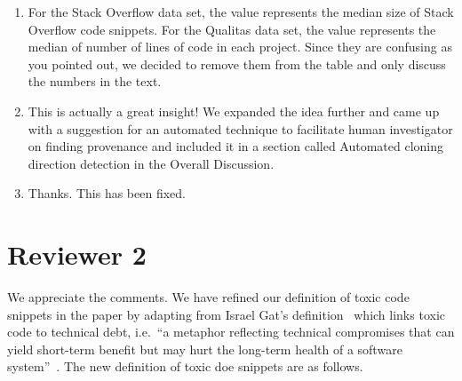 \documentclass[a4paper,twoside,10pt]{reviewresponse}
\begin{document}
\begin{enumerate}
	\item For the Stack Overflow data set, the value represents the median size of Stack Overflow code snippets. For the Qualitas data set, the value represents the median of number of lines of code in each project. Since they are confusing as you pointed out, we decided to remove them from the table and only discuss the numbers in the text.
	\item This is actually a great insight! We expanded the idea further and came up with a suggestion for an automated technique to facilitate human investigator on finding provenance and included it in a section called Automated cloning direction detection in the Overall Discussion.
	\item Thanks. This has been fixed.
\end{enumerate}

\section{Reviewer 2}


We appreciate the comments. We have refined our definition of toxic code snippets in the paper by adapting from Israel Gat's definition~\citep{toxiccode} which links toxic code to technical debt, i.e.~``a metaphor reflecting technical compromises that can yield short-term benefit but may hurt the long-term health of a software system''~\citep{Li2015}. The new definition of toxic doe snippets are as follows.
\end{document}
